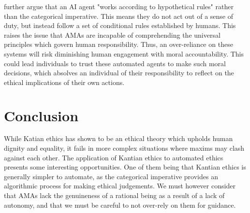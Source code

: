 \documentclass{article}
\begin{document}
\textcite[p. 148]{mannananth2021} further argue that an AI agent "works according to hypothetical rules" rather than 
the categorical imperative. This means they do not act out of a sense of duty, but instead follow a set of conditional
rules established by humans. This raises the issue that AMAs are incapable of comprehending the universal principles
which govern human responsibility. Thus, an over-reliance on these systems will risk diminishing human engagement with moral
accountability. This could lead individuals to trust these automated agents to make such moral decisions, which
absolves an individual of their responsibility to reflect on the ethical implications of their own actions.


\section{Conclusion}
While Katian ethics has shown to be an ethical theory which upholds human dignity and equality,
it fails in more complex situations where maxims may clash against each other. The application
of Kantian ethics to automated ethics presents some interesting opportunities. One of them 
being that Kantian ethics is generally simpler to automate, as the categorical imperative provides
an algorithmic process for making ethical judgements. We must however consider that AMAs 
lack the genuineness of a rational being as a result of a lack of autonomy, and that we must
be careful to not over-rely on them for guidance.

\printbibliography[title={References}]
\end{document}
